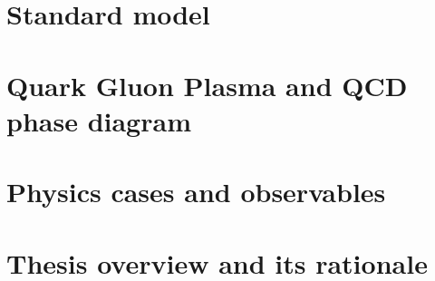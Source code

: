 \section{Standard model}
\section{Quark Gluon Plasma and QCD phase diagram}
\section{Physics cases and observables}

\section{Thesis overview and its rationale}
